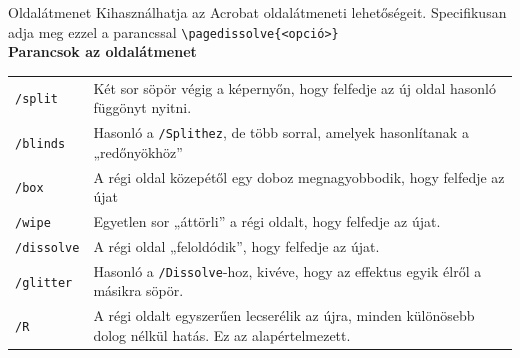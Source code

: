 \documentclass{beamer}
\begin{document}
\begin{frame}[fragile]{Oldalátmenet}
Kihasználhatja az Acrobat oldalátmeneti lehetőségeit.
Specifikusan adja meg ezzel a parancssal
\color{red}\verb|\pagedissolve{<opció>}| \color{black} \\
\textbf{Parancsok az oldalátmenet} \\
\begin{table}[h]
\begin{tabularx}{\textwidth}{l X}
\verb|/split| & Két sor söpör végig a képernyőn, hogy felfedje az új oldal hasonló függönyt nyitni. \\
\verb|/blinds| & Hasonló a \verb|/Splithez|, de több sorral, amelyek hasonlítanak a „redőnyökhöz” \\

\verb|/box|& A régi oldal közepétől egy doboz megnagyobbodik, hogy felfedje az újat \\

\verb|/wipe|& Egyetlen sor „áttörli” a régi oldalt, hogy felfedje az újat. \\

\verb|/dissolve|& A régi oldal „feloldódik”, hogy felfedje az újat. \\

 \verb|/glitter|& Hasonló a \verb|/Dissolve|-hoz, kivéve, hogy az effektus egyik élről a másikra söpör. \\

\verb|/R|&  A régi oldalt egyszerűen lecserélik az újra, minden különösebb dolog nélkül hatás. Ez az alapértelmezett. \\


\end{tabularx}
\end{table}

\end{frame}
\end{document}
